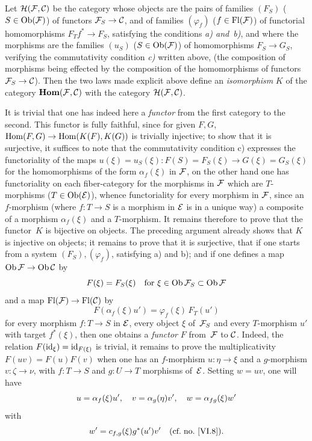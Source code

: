 \begin{proposition}
\label{VI.12.1}
Let $\cal{H}(\cal{F},\cal{C})$ be the category whose objects are
the pairs of families $(F_S)$ ($S\in\Ob(\cal{F})$) of functors
$\cal{F}_S\to\cal{C}$, and of families $(\varphi_f)$
($f\in\Fl(\cal{F})$) of functorial homomorphisms $F_Tf^*\to F_S$,
satisfying the conditions \emph{a) and~b)}, and where the morphisms
are the families $(u_S)$ ($S\in\Ob(\cal{F})$) of homomorphisms
$F_S\to G_S$, verifying the commutativity condition
\emph{c)} written above, (the composition of morphisms being
effected by the composition of the homomorphisms of functors
$\cal{F}_S\to\cal{C}$). Then the two laws made explicit above
define an \emph{isomorphism} $K$ of the category
$\SheafHom(\cal{F},\cal{C})$ with the category
$\cal{H}(\cal{F},\cal{C})$.
\end{proposition}

It is trivial that one has indeed here a \emph{functor} from the
first category to the second. This functor is fully
faithful, since for given $F,G$, $\Hom(F,G)\to\allowbreak\Hom(K(F),K(G))$
is trivially injective; to show that it is surjective, it suffices
to note that the commutativity condition c) expresses the
functoriality of the maps $u(\xi)=u_S(\xi)\colon
F(S)=F_S(\xi)\to G(\xi)=G_S(\xi)$ for the homomorphisms of the form
$\alpha_f(\xi)$ in $\cal{F}$, on the other hand one has functoriality
on each fiber-category \ie for the morphisms in $\cal{F}$
which are $T$-morphisms ($T\in\Ob(\cal{E})$), whence
functoriality for every morphism in $\cal{F}$,
since an
$f$-morphism (where $f\colon T\to S$ is a morphism in
$\cal{E}$
is in a unique way) a composite of a morphism
$\alpha_f(\xi)$ and a $T$-morphism. It remains therefore to prove that
the functor~$K$ is bijective on objects. The preceding
argument already shows that $K$ is injective on
objects; it remains to prove that it is surjective, \ie that if one starts
from a system $(F_S),(\varphi_f)$, satisfying a) and b); and if one
defines a map $\Ob\cal{F}\to\Ob\cal{C}$ by
$$
F(\xi)=F_S(\xi) \quad\text{for }
\xi\in\Ob\cal{F}_S\subset\Ob\cal{F}
$$
and a map $\Fl(\cal{F})\to\Fl(\cal{C})$ by
$$
F(\alpha_f(\xi)u')=\varphi_f(\xi)\,F_T(u')
$$
for every morphism $f\colon T\to S$ in $\cal{E}$, every object $\xi$
of~$\cal{F}_S$ and every $T$-morphism $u'$ with target $f^*(\xi)$, then one
obtains a \emph{functor} $F$ from~$\cal{F}$ to $\cal{C}$. Indeed,
the relation $F(\id_\xi)=\id_{F(\xi)}$ is trivial, it remains to
prove the multiplicativity $F(uv)=F(u)F(v)$ when one has an
$f$-morphism $u\colon\eta\to\xi$ and a $g$-morphism
$v\colon\zeta\to\nu$, with $f\colon T\to S$ and $g\colon U\to T$
morphisms of~$\cal{E}$. Setting $w=uv$, one will have
$$
u=\alpha_f(\xi)u'\quoi,\quad v=\alpha_g(\eta)v'\quoi,\quad w=\alpha_{fg}(\xi)w'
$$
with
$$
w'=c_{f,g}(\xi)g^*(u')v'\quad \hbox{(\cf no.~\ref{VI.8})}.
$$

